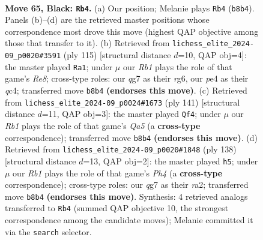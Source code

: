 \documentclass[11pt]{article}
\begin{document}
\clearpage

\begin{figure}[p]\centering
\begin{subfigure}{0.46\textwidth}\centering
\resizebox{\linewidth}{!}{%
\newchessgame
\chessboard[
  setfen={1r6/6Q1/2k3P1/7P/4P3/8/2K5/8 b - - 0 65},
  showmover=false,
  pgfstyle=straightmove, color=movearrow, markmove={b8-b4}
]}
\caption{}
\end{subfigure}\hfill
\begin{subfigure}{0.46\textwidth}\centering
\resizebox{\linewidth}{!}{%
\newchessgame
\chessboard[
  setfen={3K3k/8/6R1/6P1/2Q2P2/8/8/4r3 b - - 0 58},
  showmover=false,
  pgfstyle=straightmove, color=movearrow, markmove={e1-a1}
]}
\caption{}
\end{subfigure}
\\[4pt]
\begin{subfigure}{0.46\textwidth}\centering
\resizebox{\linewidth}{!}{%
\newchessgame
\chessboard[
  setfen={8/8/5Q2/5P1k/q7/3K4/1P6/8 b - - 1 71},
  showmover=false,
  pgfstyle=straightmove, color=movearrow, markmove={a4-f4}
]}
\caption{}
\end{subfigure}\hfill
\begin{subfigure}{0.46\textwidth}\centering
\resizebox{\linewidth}{!}{%
\newchessgame
\chessboard[
  setfen={8/2p5/1p6/1k6/7P/4p3/r7/6K1 w - - 0 70},
  showmover=false,
  pgfstyle=straightmove, color=movearrow, markmove={h4-h5}
]}
\caption{}
\end{subfigure}
\caption{\textbf{Move 65, Black: \texttt{Rb4}.} (a) Our position; Melanie plays \texttt{Rb4} (\texttt{b8b4}). Panels (b)--(d) are the retrieved master positions whose correspondence most drove this move (highest QAP objective among those that transfer to it). (b) Retrieved from \texttt{lichess\_elite\_2024-09\_p0020\#3591} (ply 115) [structural distance $d$=10, QAP obj=4]: the master played \texttt{Ra1}; under $\mu$ our \emph{Rb1} plays the role of that game's \emph{Re8}; cross-type roles: our \emph{q}g7 as their \emph{r}g6, our \emph{p}e4 as their \emph{q}c4; transferred move \texttt{b8b4} \textbf{(endorses this move)}. (c) Retrieved from \texttt{lichess\_elite\_2024-09\_p0024\#1673} (ply 141) [structural distance $d$=11, QAP obj=3]: the master played \texttt{Qf4}; under $\mu$ our \emph{Rb1} plays the role of that game's \emph{Qa5} (a \textbf{cross-type} correspondence); transferred move \texttt{b8b4} \textbf{(endorses this move)}. (d) Retrieved from \texttt{lichess\_elite\_2024-09\_p0020\#1848} (ply 138) [structural distance $d$=13, QAP obj=2]: the master played \texttt{h5}; under $\mu$ our \emph{Rb1} plays the role of that game's \emph{Ph4} (a \textbf{cross-type} correspondence); cross-type roles: our \emph{q}g7 as their \emph{r}a2; transferred move \texttt{b8b4} \textbf{(endorses this move)}. Synthesis: 4 retrieved analogs transferred to \texttt{Rb4} (summed QAP objective 10, the strongest correspondence among the candidate moves); Melanie committed it via the \texttt{search} selector.}
\label{fig:thought-m129}
\end{figure}
\end{document}
